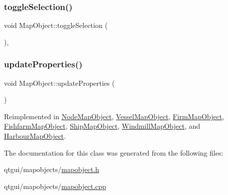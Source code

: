 \mbox{\label{class_map_object_af78a9f7d342ad67c598c42554db3d626}} 
\subsubsection{\texorpdfstring{toggleSelection()}{toggleSelection()}}
{\footnotesize\ttfamily void Map\+Object\+::toggle\+Selection (\begin{DoxyParamCaption}{ }\end{DoxyParamCaption})\hspace{0.3cm}{\ttfamily [final]}, {\ttfamily [virtual]}}

\mbox{\label{class_map_object_afa7cd6a4368f4dd077614ac1d983a6c8}} 
\subsubsection{\texorpdfstring{updateProperties()}{updateProperties()}}
{\footnotesize\ttfamily void Map\+Object\+::update\+Properties (\begin{DoxyParamCaption}{ }\end{DoxyParamCaption})\hspace{0.3cm}{\ttfamily [virtual]}}



Reimplemented in \mbox{\hyperlink{class_node_map_object_aed89e0f53469ec8af0675463ac11a9e7}{Node\+Map\+Object}}, \mbox{\hyperlink{class_vessel_map_object_aba8d2fa5bdf2bbf13ade0fe2e7ba6b32}{Vessel\+Map\+Object}}, \mbox{\hyperlink{class_firm_map_object_a565930e0db830d0f03a49f74f99eb61f}{Firm\+Map\+Object}}, \mbox{\hyperlink{class_fishfarm_map_object_a53e7378d8f4631b5c3bff739fb355674}{Fishfarm\+Map\+Object}}, \mbox{\hyperlink{class_ship_map_object_ad88a96fc3ad15c9ea919c2b6d3157fff}{Ship\+Map\+Object}}, \mbox{\hyperlink{class_windmill_map_object_ad671bf5c0701e0ad71554f563c95a9e6}{Windmill\+Map\+Object}}, and \mbox{\hyperlink{class_harbour_map_object_acffca3c0eb5fdd53e440dad3263d2b5c}{Harbour\+Map\+Object}}.



The documentation for this class was generated from the following files\+:\begin{DoxyCompactItemize}
\item 
qtgui/mapobjects/\mbox{\hyperlink{mapobject_8h}{mapobject.\+h}}\item 
qtgui/mapobjects/\mbox{\hyperlink{mapobject_8cpp}{mapobject.\+cpp}}\end{DoxyCompactItemize}
